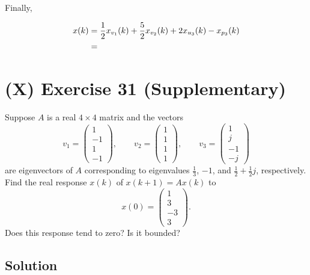 \documentclass[12pt,a4paper]{article}
\begin{document}
Finally, 

\begin{align*}
	x(k) &= {1\over2} x_{v_1}(k) + {5\over2} x_{v_2}(k) + 2 x_{u_3}(k) - x_{p_3}(k) \\
	&= 
\end{align*}

\vspace{4cm}
\clearpage
\section*{(X) Exercise 31 \hfill {\normalsize (Supplementary)}}
Suppose $A$ is a real $4\times4$ matrix and the vectors
\[
v_1=\begin{pmatrix}1\\-1\\1\\-1\end{pmatrix},\qquad
v_2=\begin{pmatrix}1\\1\\1\\1\end{pmatrix},\qquad
v_3=\begin{pmatrix}1\\j\\-1\\-j\end{pmatrix}
\]
are eigenvectors of $A$ corresponding to eigenvalues $\tfrac13$, $-1$, and
$\tfrac12+\tfrac12j$, respectively. Find the real response $x(k)$ of
$x(k+1)=Ax(k)$ to
\[
x(0)=\begin{pmatrix}1\\3\\-3\\3\end{pmatrix}.
\]
Does this response tend to zero? Is it bounded?
\subsection*{Solution}
\vspace{4cm}
\clearpage
\end{document}
